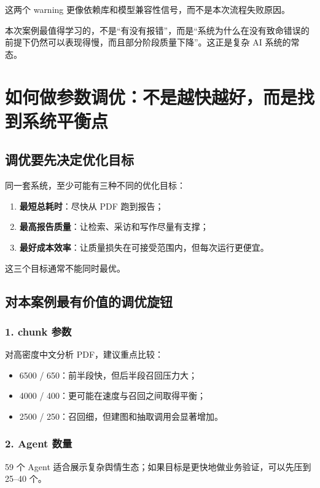 \documentclass[UTF8,10pt,oneside]{ctexbook}
\begin{document}
这两个 warning 更像依赖库和模型兼容性信号，而不是本次流程失败原因。

\begin{takeawaybox}[本章核心结论]
本次案例最值得学习的，不是“有没有报错”，而是“系统为什么在没有致命错误的前提下仍然可以表现得慢，而且部分阶段质量下降”。这正是复杂 AI 系统的常态。
\end{takeawaybox}

\chapter{如何做参数调优：不是越快越好，而是找到系统平衡点}

\section{调优要先决定优化目标}

同一套系统，至少可能有三种不同的优化目标：

\begin{enumerate}
  \item \textbf{最短总耗时}：尽快从 PDF 跑到报告；
  \item \textbf{最高报告质量}：让检索、采访和写作尽量有支撑；
  \item \textbf{最好成本效率}：让质量损失在可接受范围内，但每次运行更便宜。
\end{enumerate}

这三个目标通常不能同时最优。

\section{对本案例最有价值的调优旋钮}

\subsection*{1. chunk 参数}
对高密度中文分析 PDF，建议重点比较：

\begin{itemize}
  \item 6500 / 650：前半段快，但后半段召回压力大；
  \item 4000 / 400：更可能在速度与召回之间取得平衡；
  \item 2500 / 250：召回细，但建图和抽取调用会显著增加。
\end{itemize}

\subsection*{2. Agent 数量}
59 个 Agent 适合展示复杂舆情生态；如果目标是更快地做业务验证，可以先压到 25--40 个。
\end{document}
